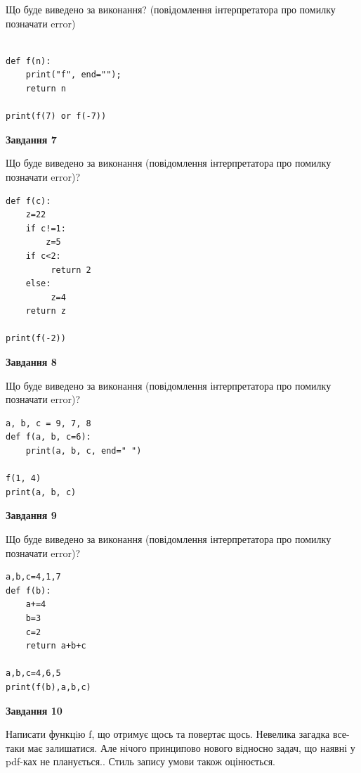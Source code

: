 \documentclass[12pt, ukrainian]{article}
\begin{document}
{\begin {large}
Що буде виведено за виконання? (повідомлення інтерпретатора про помилку позначати error)\par
\begin{verbatim}

def f(n):
    print("f", end="");
    return n

print(f(7) or f(-7))
\end{verbatim}

{\begin {center}\textbf{Завдання 7}\end {center}}

Що буде виведено за виконання (повідомлення інтерпретатора про помилку позначати error)?\par
\begin{verbatim}
def f(c):
    z=22
    if c!=1: 
        z=5
    if c<2:
         return 2
    else:
         z=4
    return z

print(f(-2))
\end{verbatim}

{\begin {center}\textbf{Завдання 8}\end {center}}

Що буде виведено за виконання (повідомлення інтерпретатора про помилку позначати error)?\par
\begin{verbatim}
a, b, c = 9, 7, 8
def f(a, b, c=6):
    print(a, b, c, end=" ")

f(1, 4)
print(a, b, c)
\end{verbatim}

{\begin {center}\textbf{Завдання 9}\end {center}}

Що буде виведено за виконання (повідомлення інтерпретатора про помилку позначати error)?\par
\begin{verbatim}
a,b,c=4,1,7
def f(b):
    a+=4
    b=3
    c=2
    return a+b+c

a,b,c=4,6,5
print(f(b),a,b,c)
\end{verbatim}

{\begin {center}\textbf{Завдання 10}\end {center}}


Написати функцiю f, що отримує щось та повертає щось. Невелика загадка все-таки має залишатися. Але нічого принципово нового відносно задач, що наявні у pdf-ках не планується.. Стиль запису умови також оцінюється.\par
\end {large}}
\newpage
\end{document}
